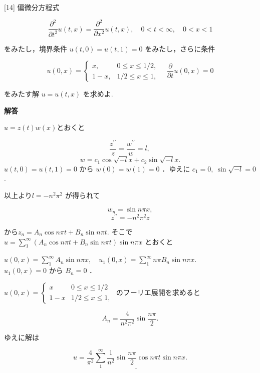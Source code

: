 \documentclass{jsarticle}
\begin{document}
\bigskip
\bigskip

\begin{itembox}[l]{[14]}
偏微分方程式


\begin{equation*}
\frac{\partial^{2}}{\partial t^{2}} u(t, x)=\frac{\partial^{2}}{\partial x^{2}} u(t, x), \quad 0<t<\infty, \quad 0<x<1 \tag{24}
\end{equation*}


をみたし，境界条件 $u(t, 0)=u(t, 1)=0$ をみたし，さらに条件

\[
u(0, x)=\left\{\begin{array}{rl}
x, & 0 \leqslant x \leqslant 1 / 2,  \tag{25}\\
1-x, & 1 / 2 \leqslant x \leqslant 1,
\end{array} \quad \frac{\partial}{\partial t} u(0, x)=0\right.
\]

をみたす解 $u=u(t, x)$ を求めよ.  
\end{itembox}

\textbf{解答}

$u=z(t)w(x)$とおくと

$$
\frac{z^{\prime \prime}}{z}=\frac{w^{\prime \prime}}{w}=l \text {, }
$$
$$
w=c_{1} \cos \sqrt{-l}x + c_{2} \sin \sqrt{-l}x.
$$
$u(t, 0)=u(t, 1)=0$ から $w(0)=w(1)=0$ ．ゆえに
$c_1 = 0, \ \sin\sqrt{-l} = 0$.

以上より$l=-n^2\pi^2$ が得られて

$$
w_{n}=\sin n \pi x,
$$
$$
z^{\prime \prime}=-n^{2} \pi^{2} z
$$

から$z_n = A_n \cos n\pi t + B_n \sin n\pi t$. そこで
$u = \displaystyle \sum_1^{\infty} (A_n \cos n\pi t + B_n \sin n\pi t) \sin n\pi x$ とおくと

$u(0, x)= \displaystyle \sum_{1}^{\infty} A_{n} \sin n \pi x, \quad u_{1}(0, x)=\sum_{1}^{\infty} n \pi B_{n} \sin n \pi x$.\\
$u_{1}(0,x)=0$ から $B_{n}=0$ ．

$u(0,x) = \begin{cases}
x & 0 \le x \le 1/2 \\
1-x & 1/2 \le x \le 1,
\end{cases}$
のフーリエ展開を求めると

$$
A_{n}=\frac{4}{n^{2} \pi^{2}} \sin \frac{n \pi}{2} .
$$

ゆえに解は

$$
u= \underline{\frac{4}{\pi^{2}} \sum_{1}^{\infty} \frac{1}{n^{2}} \sin \frac{n \pi}{2} \cos n \pi t \sin n \pi x} .
$$
\end{document}
